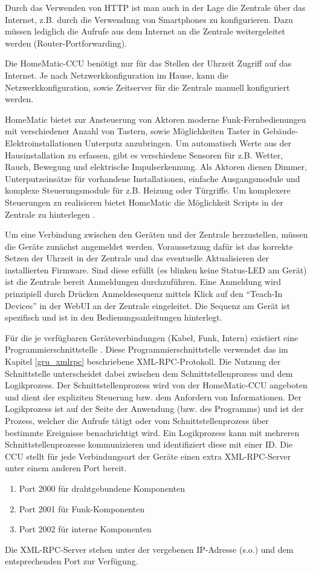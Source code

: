Durch das Verwenden von HTTP ist man auch in der Lage die Zentrale
über das Internet, z.B. durch die Verwendung von Smartphones zu konfigurieren.
Dazu müssen lediglich die Aufrufe aus dem Internet an die Zentrale weitergeleitet werden
(Router-Portforwarding).

Die HomeMatic-CCU benötigt nur für das Stellen der Uhrzeit Zugriff auf das Internet.
Je nach Netzwerkkonfiguration im Hause, kann die Netzwerkkonfiguration, sowie Zeitserver
für die Zentrale manuell konfiguriert werden.

HomeMatic bietet zur Ansteuerung von Aktoren moderne Funk-Fernbedienungen mit verschiedener
Anzahl von Tastern, sowie Möglichkeiten Taster in Gebäude-Elektroinstallationen Unterputz anzubringen.
Um automatisch Werte aus der Hausinstallation zu erfassen, gibt es verschiedene Sensoren für z.B.
Wetter, Rauch, Bewegung und elektrische Impulserkennung.
Als Aktoren dienen Dimmer, Unterputzeinsätze für vorhandene Installationen, einfache Ausgangsmodule und
komplexe Steuerungsmodule für z.B. Heizung oder Türgriffe.
Um komplexere Steuerungen zu realisieren bietet HomeMatic die Möglichkeit Scripts in der Zentrale
zu hinterlegen \cite{hmscript1}.

Um eine Verbindung zwischen den Geräten und der Zentrale herzustellen, müssen die Geräte zunächst
angemeldet werden.
Voraussetzung dafür ist das korrekte Setzen der Uhrzeit in der Zentrale und das eventuelle
Aktualisieren der installierten Firmware.
Sind diese erfüllt (es blinken keine Status-LED am Gerät) ist die Zentrale bereit Anmeldungen
durchzuführen.
Eine Anmeldung wird prinzipiell durch Drücken Anmeldesequenz mittels Klick auf den ``Teach-In Devices''
in der WebUI an der Zentrale eingeleitet.
Die Sequenz am Gerät ist spezifisch und ist in den Bedienungsanleitungen hinterlegt.

Für die je verfügbaren Geräteverbindungen (Kabel, Funk, Intern) existiert eine Programmierschnittstelle
\cite[Seite 4]{homematic_xmlrpc}.
Diese Programmierschnittstelle verwendet das im Kapitel \ref{gru_xmlrpc} beschriebene XML-RPC-Protokoll.
Die Nutzung der Schnittstelle unterscheidet dabei zwischen dem Schnittstellenprozess und dem Logikprozess.
Der Schnittstellenprozess wird von der HomeMatic-CCU angeboten und dient der expliziten Steuerung
bzw. dem Anfordern von Informationen.
Der Logikprozess ist auf der Seite der Anwendung (bzw. des Programms) und ist der Prozess, welcher die
Aufrufe tätigt oder vom Schnittstellenprozess über bestimmte Ereignisse benachrichtigt wird.
Ein Logikprozess kann mit mehreren Schnittstellenprozesse kommunizieren \cite[Seite 3]{homematic_xmlrpc}
und identifiziert diese mit einer ID.
Die CCU stellt für jede Verbindungsart der Geräte einen extra XML-RPC-Server unter einem anderen Port
bereit.
\begin{enumerate}
\item Port 2000 für drahtgebundene Komponenten
\item Port 2001 für Funk-Komponenten
\item Port 2002 für interne Komponenten
\end{enumerate}
Die XML-RPC-Server stehen unter der vergebenen IP-Adresse (s.o.) und dem entsprechenden Port
zur Verfügung.
